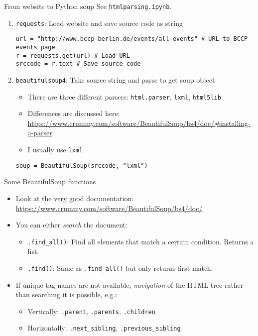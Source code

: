\begin{frame}[fragile]{From website to Python soup}
See \verb!htmlparsing.ipynb!.
\begin{enumerate}
	\item \texttt{requests}: Load website and save source code as string
\begin{verbatim}
url = "http://www.bccp-berlin.de/events/all-events" # URL to BCCP events page
r = requests.get(url) # Load URL
srccode = r.text # Save source code
\end{verbatim}
	\item \texttt{beautifulsoup4}: Take source string and parse to get soup object
		\begin{itemize}
			\item There are three different parsers: \texttt{html.parser}, \texttt{lxml}, \texttt{html5lib}
			\item Differences are discussed here: \url{https://www.crummy.com/software/BeautifulSoup/bs4/doc/#installing-a-parser}
			\item I usually use \texttt{lxml}
		\end{itemize}
\begin{verbatim}
soup = BeautifulSoup(srccode, "lxml")
\end{verbatim}
\end{enumerate}
\end{frame}

\begin{frame}[fragile]{Some BeautifulSoup functions}
\begin{itemize}
	\item Look at the very good documentation: \url{https://www.crummy.com/software/BeautifulSoup/bs4/doc/}
	\item You can either \textit{search} the document:
	\begin{itemize}
		\item \texttt{.find_all()}: Find all elements that match a certain condition. Returns a list.
		\item \texttt{.find()}: Same as \texttt{.find_all()} but only returns first match.
	\end{itemize}
	\item If unique tag names are not available, \textit{navigation} of the HTML tree rather than searching it is possible, e.g.:
	\begin{itemize}
		\item Vertically: \texttt{.parent}, \texttt{.parents}, \texttt{.children}
		\item Horizontally: \texttt{.next_sibling}, \texttt{.previous_sibling}
	\end{itemize}
\end{itemize}
\end{frame}